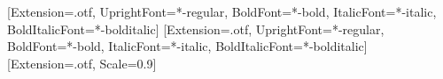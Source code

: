 [Extension=.otf, UprightFont=*-regular, BoldFont=*-bold,
  ItalicFont=*-italic, BoldItalicFont=*-bolditalic]
[Extension=.otf, UprightFont=*-regular, BoldFont=*-bold,
  ItalicFont=*-italic, BoldItalicFont=*-bolditalic]
[Extension=.otf, Scale=0.9]
